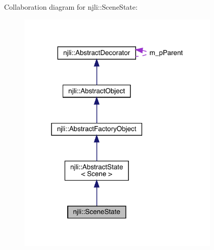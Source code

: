 Collaboration diagram for njli\+:\+:Scene\+State\+:\nopagebreak
\begin{figure}[H]
\begin{center}
\leavevmode
\includegraphics[width=273pt]{classnjli_1_1_scene_state__coll__graph}
\end{center}
\end{figure}
